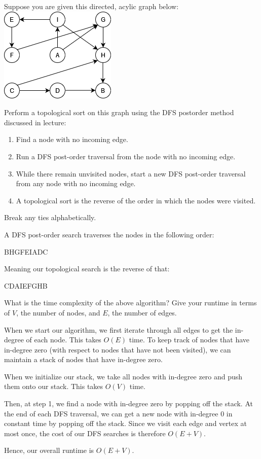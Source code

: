 \graphicspath{{./}}

\question Suppose you are given this directed, acylic graph below: \\

\includegraphics[]{topics/sorting/medium/topological-mechanical/dag.png}

Perform a topological sort on this graph using the DFS postorder method discussed in lecture:
\begin{enumerate}
    \item Find a node with no incoming edge.
    \item Run a DFS post-order traversal from the node with no incoming edge.
    \item While there remain unvisited nodes, start a new DFS post-order traversal from any node with no incoming edge.
    \item A topological sort is the reverse of the order in which the nodes were visited.
\end{enumerate}
Break any ties alphabetically.

\begin{solution}
A DFS post-order search traverses the nodes in the following order:

BHGFEIADC

Meaning our topological search is the reverse of that:

CDAIEFGHB
\end{solution}

\question What is the time complexity of the above algorithm? Give your runtime in terms of $V$, the number of nodes, and $E$, the number of edges.

\begin{solution}
When we start our algorithm, we first iterate through all edges to get the in-degree of each node. This takes $O(E)$ time. To keep track of nodes that have in-degree zero (with respect to nodes that have not been visited), we can maintain a stack of nodes that have in-degree zero.

When we initialize our stack, we take all nodes with in-degree zero and push them onto our stack. This takes $O(V)$ time.

Then, at step 1, we find a node with in-degree zero by popping off the stack. At the end of each DFS traversal, we can get a new node with in-degree 0 in constant time by popping off the stack. Since we visit each edge and vertex at most once, the cost of our DFS searches is therefore $O(E+V)$.

Hence, our overall runtime is $O(E+V)$.
\end{solution}
